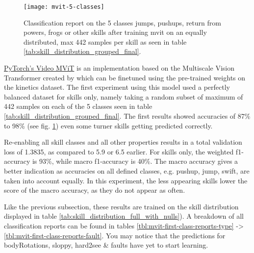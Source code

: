 \begin{figure}
    \centering
    \texttt{[image: mvit-5-classes]}
    \caption[Classification report on only 5 skill classes]{Classification report on the 5 classes jumps, pushups, return from powers, frogs or other skills after training mvit on an equally distributed, max 442 samples per skill as seen in table \ref{tab:skill_distribution_grouped_final}.}
    \label{fig:mvit-5-classes}
\end{figure}


\href{https://pytorch.org/vision/main/models/video_mvit.html}{PyTorch's Video MViT} is an implementation based on the Multiscale Vision Transformer created by \textcite{Fan2021} which can be finetuned using the pre-trained weights on the kinetics dataset.
The first experiment using this model used a perfectly balanced dataset for skills only, namely taking a random subset of maximum of 442 samples on each of the 5 classes seen in table \ref{tab:skill_distribution_grouped_final}.
The first results showed accuracies of 87\% to 98\% (see fig. \ref{fig:mvit-5-classes}) even some turner skills getting predicted correctly.

Re-enabling all skill classes and all other properties results in a total validation loss of 1.3835, as compared to 5.9 or 6.5 earlier.
For skills only, the weighted f1-accuracy is 93\%, while macro f1-accuracy is 40\%.
The macro accuracy gives a better indication as accuracies on all defined classes, e.g. pushup, jump, swift, are taken into account equally. In this experiment, the less appearing skills lower the score of the macro accuracy, as they do not appear as often.

Like the previous subsection, these results are trained on the skill distribution displayed in table \ref{tab:skill_distribution_full_with_nulls}).
A breakdown of all classification reports can be found in tables \ref{tbl:mvit-first-class-reports-type} -> \ref{tbl:mvit-first-class-reports-fault}. You may notice that the predictions for bodyRotations, sloppy, hard2see \& faults have yet to start learning.

